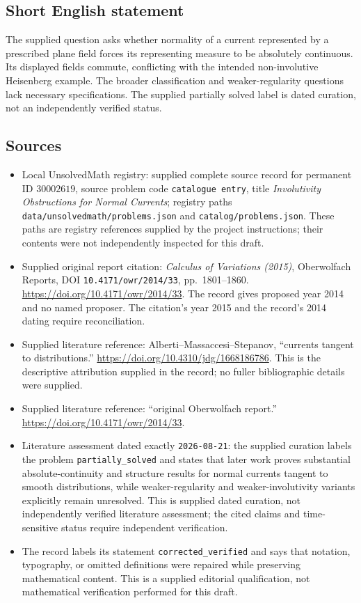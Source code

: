 \documentclass[11pt]{article}
\begin{document}
\subsection{Short English statement}
The supplied question asks whether normality of a current represented by a prescribed plane field forces its representing measure to be absolutely continuous. Its displayed fields commute, conflicting with the intended non-involutive Heisenberg example. The broader classification and weaker-regularity questions lack necessary specifications. The supplied partially solved label is dated curation, not an independently verified status.
\subsection{Sources}
\begin{itemize}
\item Local UnsolvedMath registry: supplied complete source record for permanent ID \(30002619\), source problem code \texttt{catalogue entry}, title \emph{Involutivity Obstructions for Normal Currents}; registry paths \texttt{data/unsolvedmath/problems.json} and \texttt{catalog/problems.json}. These paths are registry references supplied by the project instructions; their contents were not independently inspected for this draft.
\item Supplied original report citation: \emph{Calculus of Variations (2015)}, Oberwolfach Reports, DOI \texttt{10.4171/owr/2014/33}, pp.\ 1801--1860. \url{https://doi.org/10.4171/owr/2014/33}. The record gives proposed year 2014 and no named proposer. The citation's year 2015 and the record's 2014 dating require reconciliation.
\item Supplied literature reference: Alberti--Massaccesi--Stepanov, ``currents tangent to distributions.'' \url{https://doi.org/10.4310/jdg/1668186786}. This is the descriptive attribution supplied in the record; no fuller bibliographic details were supplied.
\item Supplied literature reference: ``original Oberwolfach report.'' \url{https://doi.org/10.4171/owr/2014/33}.
\item Literature assessment dated exactly \texttt{2026-08-21}: the supplied curation labels the problem \texttt{partially\_solved} and states that later work proves substantial absolute-continuity and structure results for normal currents tangent to smooth distributions, while weaker-regularity and weaker-involutivity variants explicitly remain unresolved. This is supplied dated curation, not independently verified literature assessment; the cited claims and time-sensitive status require independent verification.
\item The record labels its statement \texttt{corrected\_verified} and says that notation, typography, or omitted definitions were repaired while preserving mathematical content. This is a supplied editorial qualification, not mathematical verification performed for this draft.
\end{itemize}
\end{document}
